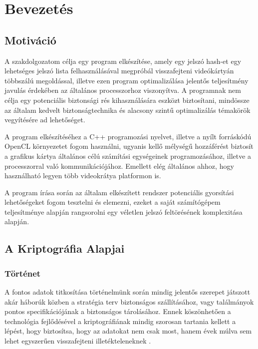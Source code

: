 \chapter{Bevezetés} %
\label{ch:intro}



\section{Motiváció}

A szakdolgozatom célja egy program elkészítése, amely egy jelszó hash-et egy lehetséges jelszó lista felhasználásával megpróbál visszafejteni videókártyán többszálú megoldással, illetve ezen program optimalizálása jelentős teljesítmény javulás érdekében az általános processzorhoz viszonyítva. A programnak nem célja egy potenciális biztonsági rés kihasználására eszközt biztosítani, mindössze az általam kedvelt biztonságtechnika és alacsony szintű optimalizálás témakörök vegyítésére ad lehetőséget.

A program elkészítéséhez a C++ programozási nyelvet, illetve a nyílt forráskódú OpenCL környezetet fogom használni, ugyanis kellő mélységű hozzáférést biztosít a grafikus kártya általános célú számítási egységeinek programozásához, illetve a processzorral való kommunikációjához. Emellett elég általános ahhoz, hogy használható legyen több videokrátya platformon is.

A program írása során az általam elkészített rendszer potenciális gyorsítási lehetőségeket fogom tesztelni és elemezni, ezeket a saját számítógépem teljesítménye alapján rangsorolni egy véletlen jelszó feltörésének komplexitása alapján.


\section{A Kriptográfia Alapjai}

\subsection{Történet}
A fontos adatok titkosítása történelmünk során mindig jelentős szerepet játszott akár háborúk közben a stratégia terv biztonságos szállításához, vagy találmányok pontos specifikációjának a biztonságos tárolásához. Ennek köszönhetően a technológia fejlődésével a kriptográfiának mindig szorosan tartania kellett a lépést, hogy biztosítsa, hogy az adatokat nem csak most, hanem évek múlva sem lehet egyszerűen visszafejteni illetékteleneknek \cite{katz2020introduction}.

